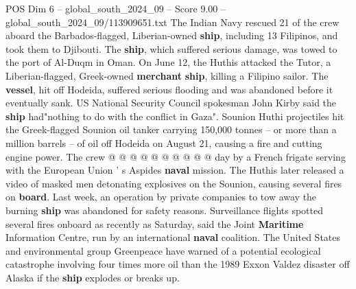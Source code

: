 \begin{textsample}{POS Dim 6 – global\_south\_2024\_09 – Score 9.00 – global\_south\_2024\_09/113909651.txt}
The Indian Navy rescued 21 of the crew aboard the Barbados-flagged, Liberian-owned \textbf{ship}, including 13 Filipinos, and took them to Djibouti.
The \textbf{ship}, which suffered serious damage, was towed to the port of Al-Duqm in Oman.
On June 12, the Huthis attacked the Tutor, a Liberian-flagged, Greek-owned \textbf{merchant} \textbf{ship}, killing a Filipino sailor.
The \textbf{vessel}, hit off Hodeida, suffered serious flooding and was abandoned before it eventually sank.
US National Security Council spokesman John Kirby said the \textbf{ship} had"nothing to do with the conflict in Gaza".
Sounion Huthi projectiles hit the Greek-flagged Sounion oil tanker carrying 150,000 tonnes -- or more than a million barrels -- of oil off Hodeida on August 21, causing a fire and cutting engine power.
The crew @ @ @ @ @ @ @ @ @ @ day by a French frigate serving with the European Union ' s Aspides \textbf{naval} mission.
The Huthis later released a video of masked men detonating explosives on the Sounion, causing several fires on \textbf{board}.
Last week, an operation by private companies to tow away the burning \textbf{ship} was abandoned for safety reasons.
Surveillance flights spotted several fires onboard as recently as Saturday, said the Joint \textbf{Maritime} Information Centre, run by an international \textbf{naval} coalition.
The United States and environmental group Greenpeace have warned of a potential ecological catastrophe involving four times more oil than the 1989 Exxon Valdez disaster off Alaska if the \textbf{ship} explodes or breaks up.

\end{textsample}
